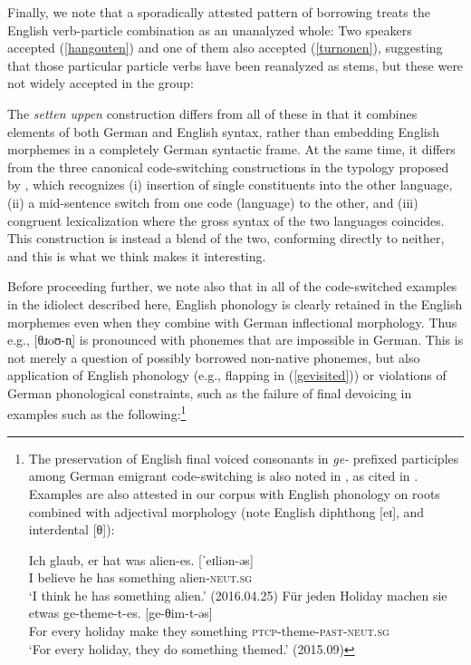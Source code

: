 \documentclass[output=paper]{langscibook}
\begin{document}
Finally, we note that a sporadically attested pattern of borrowing treats the English verb-particle combination as an unanalyzed whole: Two speakers accepted (\ref{hangouten}) and one of them also accepted (\ref{turnonen}), suggesting that those particular particle verbs have been reanalyzed as stems, but these were not widely accepted in the group:

\ea
{}
\z\z 

The \textit{setten uppen} construction differs from all of these in that it combines elements of both German and English syntax, rather than embedding English morphemes in a completely German syntactic frame. At the same time, it differs from the three canonical code-switching constructions in the typology proposed by \citet{muysken00}, which recognizes (i) insertion of single constituents into the other language, (ii) a mid-sentence switch from one code (language) to the other, and (iii) congruent lexicalization where the gross syntax of the two languages coincides. This construction is instead a blend of the two, conforming directly to neither, and this is what we think makes it interesting. 

Before proceeding further, we note also that in all of the code-switched examples in the idiolect described here, English phonology is clearly retained in the English morphemes even when they combine with German inflectional morphology. Thus e.g., {[}θɹoʊ\nobreakdash-n̩{]} is pronounced with phonemes that are impossible in German. This is not merely a question of possibly borrowed non-native phonemes, but also application of English phonology (e.g., flapping in (\ref{gevisited})) or violations of German phonological constraints, such as the failure of final devoicing in examples such as the following:\footnote{The preservation of English final voiced consonants in \textit{ge-} prefixed participles among German emigrant code-switching is also noted in \cite{gross00}, as cited in \citet[159-160]{myersscotton02}. Examples are also attested in our corpus with English phonology on roots combined with adjectival morphology (note English diphthong {[}eɪ{]}, and interdental {[}θ{]}):

\ea\gll Ich glaub, er hat was {alien-es. {[}ˈeɪliən-əs{]}}\\
I believe he has something alien-\textsc{neut.sg}\\
\glt `I think he has something alien.' (2016.04.25)
\z 
\ea\gll Für jeden Holiday machen sie etwas {ge-theme-t-es. {[}ge-θim-t-əs{]}}\\
For every holiday make they something \textsc{ptcp}-theme-\textsc{past}-\textsc{neut.sg}\\
\glt `For every holiday, they do something themed.' (2015.09)
\z
}
\end{document}
